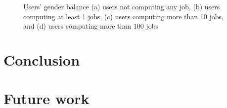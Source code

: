 \documentclass{article}
\begin{document}
\begin{figure}[t]
	\begin{center}
	\end{center}
	\caption{Users' gender balance  (a) users not computing any job, (b) users computing at least 1 jobs, (c) users computing more than 10 jobs, and (d) users computing more than 100 jobs}
	\label{img:genderchallenge}
\end{figure} 
      
    
    
    
%      
%      
%      
%      
%
%
%
%
%










\section{Conclusion}


\section{Future work}
\end{document}
